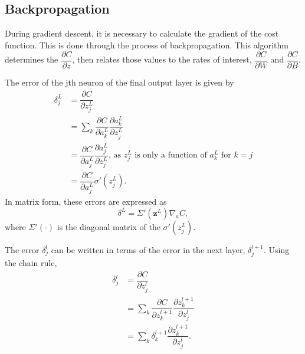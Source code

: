 \documentclass[honours,12pt]{unswthesis}
\numberwithin{equation}{section}
\begin{document}
%
%
%


\subsection{Backpropagation}

During gradient descent, it is necessary to calculate the gradient of the cost function. This is done through the process of backpropagation. This algorithm determines the $\dfrac{\partial C}{\partial z}$, then relates those values to the rates of interest, $\dfrac{\partial C}{\partial W}$ and $\dfrac{\partial C}{\partial B}$.


The error of the jth neuron of the final output layer is given by
\begin{align*}
	\delta_j^L & = \dfrac{\partial C}{\partial z_j^L} \\
	& = \sum_k\dfrac{\partial C}{\partial a_k^L}\dfrac{\partial a_k^L}{\partial z_j^L} \\
	& = \dfrac{\partial C}{\partial a_j^L}\dfrac{\partial a_j^L}{\partial z_j^L}\text{, as }z_j^L\text{ is only a function of }a_k^L\text{ for }k = j \\
	& = \dfrac{\partial C}{\partial a_j^L}\sigma'(z_j^L).
\end{align*}
In matrix form, these errors are expressed as
\[
	\delta^L = \Sigma'(\mathbf{z}^L)\nabla_aC,
\]
where $\Sigma'(\cdot)$ is the diagonal matrix of the $\sigma'(z_j^L)$.

The error $\delta_j^l$ can be written in terms of the error in the next layer, $\delta_j^{l+1}$. Using the chain rule,
\begin{align*}
	\delta_j^l & = \dfrac{\partial C}{\partial z_j^l} \\
	& = \sum_k\dfrac{\partial C}{\partial z_k^{l+1}}\dfrac{\partial z_k^{l+1}}{\partial z_j^l} \\
	& = \sum_k\delta_k^{l+1}\dfrac{\partial z_k^{l+1}}{\partial z_j^l}.
\end{align*}
\end{document}
